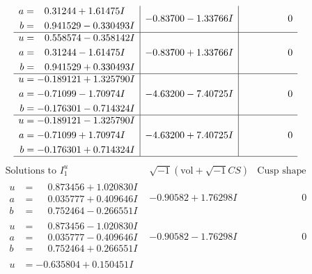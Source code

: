 \documentclass[1p]{elsarticle_modified}
\theoremstyle{definition}
\newcommand{\I}{\sqrt{-1}}
\begin{document}
$$\begin{array}{c|c|c}
\begin{aligned}
a &= \phantom{-}0.31244 + 1.61475 I \\
b &= \phantom{-}0.941529 - 0.330493 I\end{aligned}
 & -0.83700 - 1.33766 I & \phantom{-0.000000 } 0 \\ \hline\begin{aligned}
u &= \phantom{-}0.558574 - 0.358142 I \\
a &= \phantom{-}0.31244 - 1.61475 I \\
b &= \phantom{-}0.941529 + 0.330493 I\end{aligned}
 & -0.83700 + 1.33766 I & \phantom{-0.000000 } 0 \\ \hline\begin{aligned}
u &= -0.189121 + 1.325790 I \\
a &= -0.71099 - 1.70974 I \\
b &= -0.176301 - 0.714324 I\end{aligned}
 & -4.63200 - 7.40725 I & \phantom{-0.000000 } 0 \\ \hline\begin{aligned}
u &= -0.189121 - 1.325790 I \\
a &= -0.71099 + 1.70974 I \\
b &= -0.176301 + 0.714324 I\end{aligned}
 & -4.63200 + 7.40725 I & \phantom{-0.000000 } 0\\
 \hline 
 \end{array}$$\newpage$$\begin{array}{c|c|c}  
\text{Solutions to }I^u_{1}& \I (\text{vol} + \sqrt{-1}CS) & \text{Cusp shape}\\
 \hline 
\begin{aligned}
u &= \phantom{-}0.873456 + 1.020830 I \\
a &= \phantom{-}0.035777 + 0.409646 I \\
b &= \phantom{-}0.752464 - 0.266551 I\end{aligned}
 & -0.90582 + 1.76298 I & \phantom{-0.000000 } 0 \\ \hline\begin{aligned}
u &= \phantom{-}0.873456 - 1.020830 I \\
a &= \phantom{-}0.035777 - 0.409646 I \\
b &= \phantom{-}0.752464 + 0.266551 I\end{aligned}
 & -0.90582 - 1.76298 I & \phantom{-0.000000 } 0 \\ \hline\begin{aligned}
u &= -0.635804 + 0.150451 I \\

\end{aligned}
\end{array}$$
\end{document}
